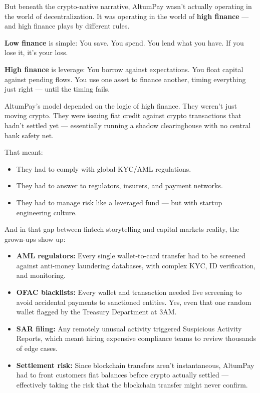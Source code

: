 But beneath the crypto-native narrative, AltumPay wasn’t actually operating in the world of decentralization.  
It was operating in the world of \textbf{high finance} — and high finance plays by different rules.

\medskip

\textbf{Low finance} is simple:  
You save. You spend. You lend what you have.  
If you lose it, it’s your loss.

\textbf{High finance} is leverage:  
You borrow against expectations.  
You float capital against pending flows.  
You use one asset to finance another, timing everything just right — until the timing fails.

AltumPay’s model depended on the logic of high finance.  
They weren’t just moving crypto.  
They were issuing fiat credit against crypto transactions that hadn’t settled yet —  
essentially running a shadow clearinghouse with no central bank safety net.

That meant:  
\begin{itemize}
  \item They had to comply with global KYC/AML regulations.
  \item They had to answer to regulators, insurers, and payment networks.
  \item They had to manage risk like a leveraged fund — but with startup engineering culture.
\end{itemize}

And in that gap between fintech storytelling and capital markets reality, the grown-ups show up:

\begin{itemize}
    \item \textbf{AML regulators:} Every single wallet-to-card transfer had to be screened against anti-money laundering databases, with complex KYC, ID verification, and monitoring.
    \item \textbf{OFAC blacklists:} Every wallet and transaction needed live screening to avoid accidental payments to sanctioned entities. Yes, even that one random wallet flagged by the Treasury Department at 3AM.
    \item \textbf{SAR filing:} Any remotely unusual activity triggered Suspicious Activity Reports, which meant hiring expensive compliance teams to review thousands of edge cases.
    \item \textbf{Settlement risk:} Since blockchain transfers aren't instantaneous, AltumPay had to front customers fiat balances before crypto actually settled --- effectively taking the risk that the blockchain transfer might never confirm.
\end{itemize}


